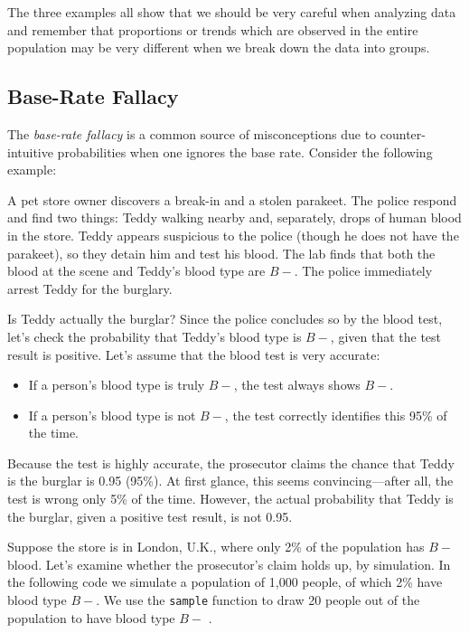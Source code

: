 The three examples all show that we should be very careful when analyzing data
and remember that proportions or trends which are observed in the entire
population may be very different when we break down the data into groups.

\subsection{Base-Rate Fallacy}\label{sec:base-rate}
The \emph{base-rate fallacy} is a common source of misconceptions due to
counter-intuitive probabilities when one ignores the base rate. Consider the
following example:

\begin{example}\label{exam:blood-type}
A pet store owner discovers a break-in and a stolen parakeet. The police respond
and find two things: Teddy walking nearby and, separately, drops of human blood
in the store. Teddy appears suspicious to the police (though he does not have
the parakeet), so they detain him and test his blood. The lab finds that both
the blood at the scene and Teddy’s blood type are $B-$. The police immediately
arrest Teddy for the burglary.
\end{example}

Is Teddy actually the burglar? Since the police concludes so by the blood test,
let's check the probability that Teddy's blood type is $B-$, given that the test
result is positive. Let's assume that the blood test is very accurate:
\begin{itemize}
\item If a person's blood type is truly $B-$, the test always shows $B-$.
\item If a person's blood type is not $B-$, the test correctly identifies this
  95\% of the time.
\end{itemize}

Because the test is highly accurate, the prosecutor claims the chance that Teddy
is the burglar is 0.95 (95\%). At first glance, this seems convincing—after all,
the test is wrong only 5\% of the time. However, the actual probability that
Teddy is the burglar, given a positive test result, is not 0.95.

Suppose the store is in London, U.K., where only 2\% of the population has $B-$
blood. Let’s examine whether the prosecutor’s claim holds up, by simulation. In
the following code we simulate a population of 1,000 people, of which 2\% have
blood type $B-$. We use the \lstinline{sample} function to draw 20 people out of the
population to have blood type $B-$ .


